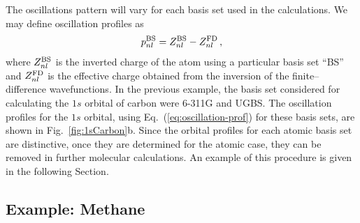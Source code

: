 \documentclass[10pt]{article}
\begin{document}
The oscillations pattern will vary for each basis set used in the 
calculations. We may define oscillation profiles as 
\begin{equation}
 p_{nl}^{\mbox{\scriptsize BS}} = Z_{nl}^{\mbox{\scriptsize BS}}-
 Z_{nl}^{\mbox{\scriptsize FD}} \,,
 \label{eq:oscillation-prof}
\end{equation}
where $Z_{nl}^{\mbox{\scriptsize BS}}$ is the inverted charge of the 
atom using a particular basis set ``BS'' and 
$Z_{nl}^{\mbox{\scriptsize FD}}$ is the effective charge obtained 
from the inversion of the finite--difference wavefunctions. In the 
previous example, the basis set considered for calculating the $1s$ 
orbital of carbon were \mbox{6-311G} and UGBS. The oscillation 
profiles for the $1s$ orbital, using Eq.~(\ref{eq:oscillation-prof}) 
for these basis sets, are shown in Fig.~\ref{fig:1sCarbon}b. Since 
the orbital profiles for each atomic basis set are distinctive, once 
they are determined for the atomic case, they can be removed in 
further molecular calculations. An example of this procedure is given 
in the following Section.

\subsection{Example: Methane}
\label{sec:dimmethane}
\end{document}
